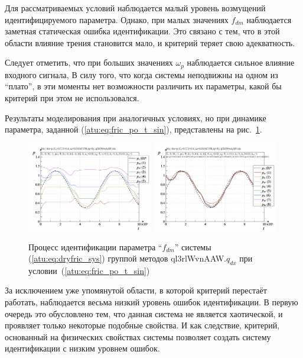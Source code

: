 Для рассматриваемых условий наблюдается малый уровень возмущений
идентифицируемого параметра. Однако, при малых значениях $f_{dm}$
наблюдается заметная статическая ошибка идентификации. Это связано с тем,
что в этой области влияние трения становится мало,
и критерий теряет свою адекватность.

Следует отметить, что при
больших значениях $\omega_p$ наблюдается
сильное влияние входного сигнала, В силу того, что когда системы неподвижны
на одном из ``плато'', в эти моменты нет возможности различить их параметры,
какой бы критерий при этом не использовался.

Результаты моделирования при аналогичных условиях, но
при динамике параметра, заданной (\ref{atu:eq:fric_po_t_sin}),
представлены на рис.~\ref{atu:f:fric_id_ql3rlWvnAAW_q_dx_sin}.

\begin{figure}[htb!]
  \centerline{
    \includegraphics[width=0.49\textwidth]{p/cha/fric/ql3rlWvnAAW/fric_id-p_t_pi_ql3rlWvnAAW_sin.png}
    \hfill
    \includegraphics[width=0.49\textwidth]{p/cha/fric/ql3rlWvnAAW/fric_id-p_t_p_ql3rlWvnAAW_sin.png}
  }
  \caption{Процесс идентификации параметра ``$f_{dm}$'' системы (\ref{atu:eq:dryfric_sys}) группой методов ql3rlWvnAAW.$q_{dx}$ при условии~(\ref{atu:eq:fric_po_t_sin})}
  \label{atu:f:fric_id_ql3rlWvnAAW_q_dx_sin}
\end{figure}

За исключением уже упомянутой области, в которой критерий перестаёт работать,
наблюдается весьма низкий уровень ошибок идентификации.
В первую очередь это обусловлено тем, что данная система не является
хаотической, и проявляет только некоторые подобные свойства.
И как следствие, критерий, основанный на физических свойствах системы
позволяет создать систему идентификации с низким уровнем ошибок.


